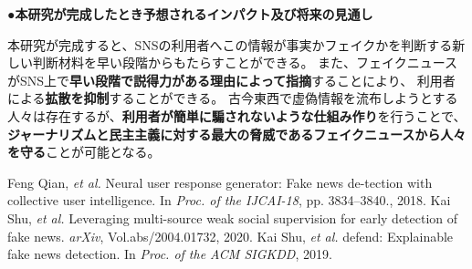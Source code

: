 {	\noindent
	●\textbf{本研究が完成したとき予想されるインパクト及び将来の見通し}

	本研究が完成すると、SNSの利用者へこの情報が事実かフェイクかを判断する新しい判断材料を早い段階からもたらすことができる。
	また、フェイクニュースがSNS上で\textbf{早い段階で説得力がある理由によって指摘}することにより、
	利用者による\textbf{拡散を抑制}することができる。
	古今東西で虚偽情報を流布しようとする人々は存在するが、\textbf{利用者が簡単に騙されないような仕組み作り}を行うことで、
	\textbf{ジャーナリズムと民主主義に対する最大の脅威であるフェイクニュースから人々を守る}ことが可能となる。
	
	{\small
		\begin{thebibliography}{99}
			\setcounter{enumiv}{6}
			 Feng Qian, \textit{et al.} Neural user response generator: Fake news de-tection with collective user intelligence. In \textit{Proc. of the IJCAI-18}, pp. 3834–3840., 2018.
			 Kai Shu, \textit{et al.} Leveraging multi-source weak social supervision for early detection of fake news. \textit{arXiv}, Vol.abs/2004.01732, 2020.
			 Kai Shu, \textit{et al.} defend: Explainable fake news detection. In \textit{Proc. of the ACM SIGKDD}, 2019.
		\end{thebibliography}
	}
}

